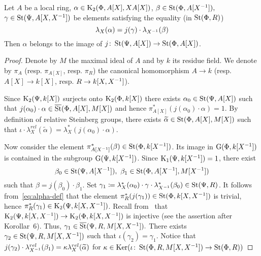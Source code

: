 \begin{lemma} \label{lem:horrocks--ingredient}
Let $A$ be a local ring, $\alpha \in \operatorname{K}_2(\Phi, A[X], XA[X])$, $\beta \in \operatorname{St}(\Phi, A[X^{-1}]),$ $\gamma \in \operatorname{St}(\Psi, A[X, X^{-1}])$ be elements satisfying the equality (in $\operatorname{St}(\Phi, R)$)
\begin{equation} \label{eq:alpha-def}\lambda_X(\alpha) = j(\gamma) \cdot \lambda_{X^{-1}}(\beta) \end{equation}
Then $\alpha$ belongs to the image of $j\colon \operatorname{St}(\Psi, A[X]) \to \operatorname{St}(\Phi, A[X])$.
\end{lemma}
\begin{proof}
    Denote by $M$ the maximal ideal of $A$ and by $k$ its residue field.
    We denote by $\pi_A$ (resp. $\pi_{A[X]}$, resp. $\pi_{R}$) the canonical homomorphism $A \to k$ (resp. $A[X] \to k[X]$, resp. $R \to k[X, X^{-1}]$).

    Since $\operatorname{K}_2(\Psi, k[X])$ surjects onto $\operatorname{K}_2(\Phi, k[X])$ there exists $\alpha_0 \in \operatorname{St}(\Psi, A[X])$ such that $j(\alpha_0) \cdot \alpha \in \overline{\operatorname{St}}(\Phi, A[X], M[X])$ and
     hence $\pi_{A[X]}^*(j(\alpha_0) \cdot \alpha) = 1$.
    By definition of relative Steinberg groups, there exists $\widetilde{\alpha} \in \operatorname{St}(\Phi, A[X], M[X])$ such that
     $\iota \cdot \lambda_X^{rel}(\widetilde{\alpha}) = \lambda_X^* (j(\alpha_0) \cdot \alpha)$. %

    Now consider the element $\pi^*_{A[X^{-1}]}(\beta) \in \operatorname{St}(\Phi, k[X^{-1}])$.
    Its image in $\operatorname{G}(\Phi, k[X^{-1}])$ is contained in the subgroup $\operatorname{G}(\Psi, k[X^{-1}])$.
    Since $\operatorname{K}_1(\Psi, k[X^{-1}]) = 1$, there exist
    \[\beta_0 \in \operatorname{St}(\Psi, A[X^{-1}]),\ \beta_1 \in \operatorname{St}(\Phi, A[X^{-1}], M[X^{-1}])\] such that $\beta = j(\beta_0) \cdot \beta_1$.
    Set $\gamma_1 \coloneqq \lambda^*_X(\alpha_0) \cdot \gamma \cdot \lambda^*_{X^{-1}}(\beta_0) \in \operatorname{St}(\Psi, R)$.
    It follows from~\eqref{eq:alpha-def} that the element $\pi_R^*(j(\gamma_1)) \in \operatorname{St}(\Phi, k[X, X^{-1}])$ is trivial, hence $\pi^*_R(\gamma_1) \in \operatorname{K}_2(\Psi, k[X, X^{-1}])$.
    Recall from~\cite{Hur77} that $\operatorname{K}_2(\Psi, k[X, X^{-1}]) \to \operatorname{K}_2(\Phi, k[X, X^{-1}])$ is injective (see the assertion after Korollar~6).
    Thus, $\gamma_1 \in \overline{\operatorname{St}}(\Psi, R, M[X, X^{-1}]).$
    There exists $\gamma_2 \in \operatorname{St}(\Psi, R, M[X, X^{-1}])$ such that $\iota (\gamma_2) = \gamma_1$.
    Notice that $j(\gamma_2) \cdot \lambda_{X^{-1}}^{rel}(\beta_1) = \kappa \lambda_X^{rel}(\widetilde{\alpha})$ for $\kappa \in \operatorname{Ker}(\iota\colon \operatorname{St}(\Phi, R, M[X, X^{-1}]) \to \operatorname{St}(\Phi, R))$


\end{proof}
